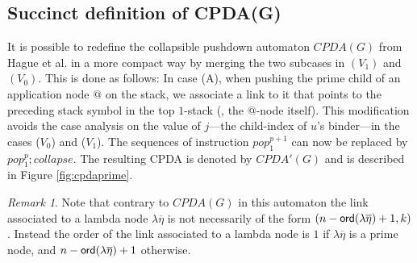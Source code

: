 \documentclass[a4paper]{article}
\theoremstyle{remark}
\newtheorem{remark}{Remark}[section]
\theoremstyle{definition}
\begin{document}
\subsection{Succinct definition of CPDA(G)}
It is possible to redefine the collapsible pushdown automaton $CPDA(G)$ from Hague et al.
\cite{hmos-lics08} in a more compact way by merging the two subcases in
$(V_1)$ and $(V_0)$. This is done as follows: In case (A), when
pushing the prime child of an application node $@$ on the stack, we
associate a link to it that points to the preceding stack symbol in
the top $1$-stack (\ie, the $@$-node itself).
 This modification avoids the case analysis on the value of $j$---the child-index of $u$'s binder---in the
 cases ($V_0$) and ($V_1$). The sequences of instruction $pop_1^{p+1}$ can now be replaced by
 $pop_1^p ; collapse$. The resulting CPDA is denoted by $CPDA'(G)$ and is described in
Figure \ref{fig:cpdaprime}.
\begin{figure}
\begin{center}
\end{center}
\end{figure}

\begin{remark}
\label{rem:linkorder_cpdaprime}
Note that contrary to $CPDA(G)$ in this automaton the link associated to a lambda node $\lambda\overline\eta$ is not necessarily of the form
$(n-{\sf ord}(\lambda\overline\eta)+1,k)$. Instead the order of the link associated to a lambda node is 
$1$ if $\lambda\overline\eta$ is a prime node, and $n-{\sf ord}(\lambda\overline\eta)+1$ otherwise. 
\end{remark}
\end{document}
